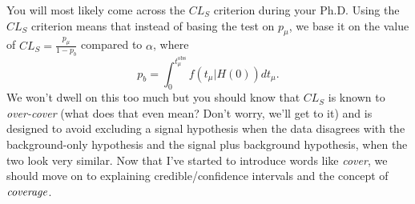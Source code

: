 You will most likely come across the $CL_{S}$ criterion during your Ph.D. Using  the $CL_{S}$ criterion  means that instead of basing the test on $p_{\mu}$, we base it on the value of $CL_{S}=\frac{p_{\mu}}{1-p_{b}}$ compared to $\alpha$, where 
\begin{equation}
    p_{b} = \int_0^{t^{\mathrm{obs}}_{\mu}}  f(t_{\mu}|H(0))dt_{\mu}.
\end{equation}
We won't dwell on this too much but you should know that $CL_{S}$ is known to \emph{over-cover} (what does that even mean? Don't worry, we'll get to it) and is designed to avoid excluding a signal hypothesis when the data disagrees with the background-only hypothesis and the signal plus background hypothesis, when the two look very similar. Now that I've started to introduce words like \emph{cover}, we should move on to explaining credible/confidence intervals and the concept of $\emph{coverage}$. 